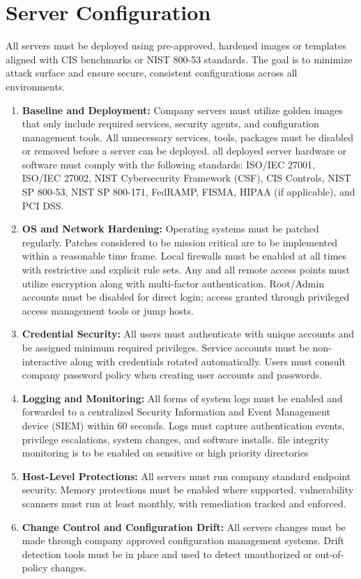 \section{Server Configuration}
All servers must be deployed using pre-approved, hardened images or templates aligned with CIS benchmarks or NIST 800-53 standards. The goal is to minimize attack surface and ensure secure, consistent configurations across all environments.
\begin{enumerate}
    \item \textbf{Baseline and Deployment:}
    Company servers must utilize golden images that only include required services, security agents, and configuration management tools. All unnecessary services, tools, packages must be disabled or removed before a server can be deployed. all deployed server hardware or software must comply with the following standards: ISO/IEC 27001, ISO/IEC 27002, NIST Cybersecurity Framework (CSF), CIS Controls, NIST SP 800-53, NIST SP 800-171, FedRAMP, FISMA, HIPAA (if applicable), and PCI DSS.
    \item \textbf{OS and Network Hardening:}
    Operating systems must be patched regularly. Patches considered to be mission critical are to be implemented within a reasonable time frame. Local firewalls must be enabled at all times with restrictive and explicit rule sets. Any and all remote access points must utilize encryption along with multi-factor authentication. Root/Admin accounts must be disabled for direct login; access granted through privileged access management tools or jump hosts.
    \item \textbf{Credential Security:}
    All users must authenticate with unique accounts and be assigned minimum required privileges. Service accounts must be non-interactive along with credentials rotated automatically. Users must consult company password policy when creating user accounts and passwords.
    \item \textbf{Logging and Monitoring:}
    All forms of system logs must be enabled and forwarded to a centralized Security Information and Event Management device (SIEM) within 60 seconds. Logs must capture authentication events, privilege escalations, system changes, and software installs. file integrity monitoring is to be enabled on sensitive or high priority directories
    \item \textbf{Host-Level Protections:}
    All servers must run company standard endpoint security. Memory protections must be enabled where supported. vulnerability scanners must run at least monthly, with remediation tracked and enforced.
    \item \textbf{Change Control and Configuration Drift:}
    All servers changes must be made through company approved configuration management systems. Drift detection tools must be in place and used to detect unauthorized or out-of-policy changes.
\end{enumerate}

